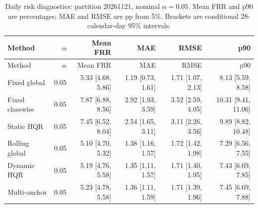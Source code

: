 \begingroup\small\setlength{\tabcolsep}{3pt}
\begin{longtable}{lrrrrr}
\caption{Daily risk diagnostics: partition 20261121, nominal $\alpha=0.05$. Mean FRR and p90 are percentages; MAE and RMSE are pp from 5\%. Brackets are conditional 28-calendar-day 95\% intervals.}\label{tab:final-risk-0-0}\\
\toprule
Method & $\alpha$ & Mean FRR & MAE & RMSE & p90\\
\midrule
\endfirsthead
\toprule
Method & $\alpha$ & Mean FRR & MAE & RMSE & p90\\
\midrule
\endhead
Fixed global & 0.05 & 5.33 [4.68, 5.86] & 1.19 [0.73, 1.61] & 1.71 [1.07, 2.13] & 8.13 [5.59, 8.58]\\
Fixed classwise & 0.05 & 7.87 [6.88, 8.56] & 2.92 [1.93, 3.59] & 3.52 [2.59, 4.05] & 10.31 [9.41, 11.06]\\
Static HQR & 0.05 & 7.45 [6.52, 8.04] & 2.54 [1.65, 3.11] & 3.11 [2.26, 3.56] & 9.89 [8.82, 10.48]\\
Rolling global & 0.05 & 5.10 [4.70, 5.32] & 1.38 [1.16, 1.57] & 1.72 [1.42, 1.98] & 7.29 [6.56, 7.55]\\
Dynamic HQR & 0.05 & 5.19 [4.76, 5.58] & 1.35 [1.11, 1.57] & 1.71 [1.40, 1.95] & 7.43 [6.69, 7.85]\\
Multi-anchor & 0.05 & 5.23 [4.78, 5.58] & 1.36 [1.11, 1.59] & 1.71 [1.39, 1.96] & 7.45 [6.69, 7.88]\\
\bottomrule
\end{longtable}
\endgroup
